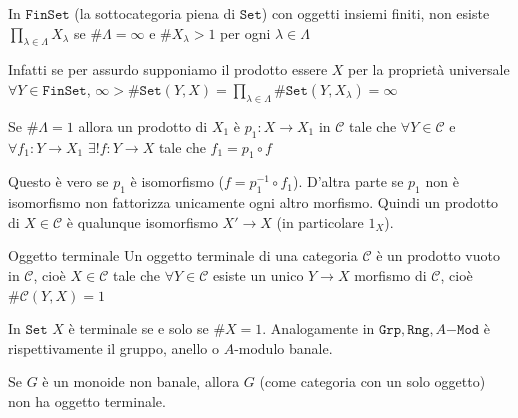 \begin{example}{}
    In \(\mathtt{FinSet}\) (la sottocategoria piena di \(\mathtt{Set}\)) con
    oggetti insiemi finiti, non esiste \(\prod_{\lambda \in \Lambda} X_\lambda\)
    se \(\# \Lambda = \infty\) e \(\# X_\lambda > 1\) per ogni \(\lambda \in
    \Lambda\) 

    Infatti se per assurdo supponiamo il prodotto essere \(X\) per la proprietà
    universale \(\forall Y \in \mathtt{FinSet}\), \( \infty > 
    \# \mathtt{Set}{(Y, X)} = \prod_{\lambda \in \Lambda} \# \mathtt{Set}(Y,
    X_\lambda) = \infty\) 
\end{example}

\begin{remark}{}
    Se \(\# \Lambda = 1\) allora un prodotto di \(X_1\) è \(p_1 : X \to X_{1}\)
    in \(\mathcal{\mathcal{C}}\) tale che \(\forall Y \in \mathcal{\mathcal{C}}\) e \(\forall f_{1} : Y \to X_{1}\) 
    \(\exists ! f : Y \to X\) tale che \(f_{1} = p_{1} \circ f\) 

    Questo è vero se \(p_{1}\) è isomorfismo (\(f = p_{1}^{-1} \circ f_{1}\)).
    D'altra parte se \(p_{1}\) non è isomorfismo non fattorizza unicamente ogni
    altro morfismo. Quindi un prodotto di \(
    X \in \mathcal{\mathcal{C}}\) è qualunque isomorfismo \(X' \to X\) (in particolare \(1_X\)).
\end{remark}

\begin{definition}{Oggetto terminale}
    Un oggetto terminale di una categoria \(\mathcal{\mathcal{C}}\) è un prodotto vuoto in
    \(\mathcal{\mathcal{C}}\), cioè \(X \in \mathcal{\mathcal{C}}\) tale che \(\forall Y \in \mathcal{\mathcal{C}}\) esiste un unico \(Y \to X\) morfismo di \(\mathcal{C}\), cioè \(\#\mathcal{\mathcal{C}}{(Y, X)} = 1\) 
\end{definition}

\begin{example}{}
    In \(\mathtt{Set}\) \(X\) è terminale se e solo se \(\# X = 1\).
    Analogamente in \(\mathtt{Grp}, \mathtt{Rng}, A\mathtt{-Mod}\) è
    rispettivamente il gruppo, anello o \(A\)-modulo banale.
\end{example}

\begin{example}{}
    Se \(G\) è un monoide non banale, allora \(G\) (come categoria con un solo
    oggetto) non ha oggetto terminale.
\end{example}

